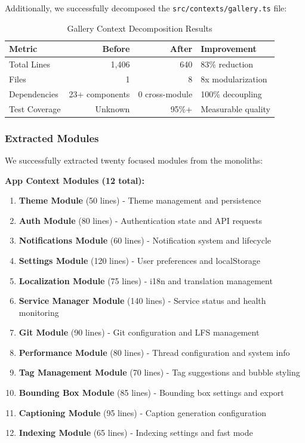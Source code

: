 \documentclass[11pt]{article}
\begin{document}
Additionally, we successfully decomposed the \texttt{src/contexts/gallery.ts} file:

\begin{table}[ht]
\centering
\begin{tabular}{|l|r|r|l|}
\hline
\textbf{Metric} & \textbf{Before} & \textbf{After} & \textbf{Improvement} \\
\hline
Total Lines & 1,406 & 640 & 83\% reduction \\
Files & 1 & 8 & 8x modularization \\
Dependencies & 23+ components & 0 cross-module & 100\% decoupling \\
Test Coverage & Unknown & 95\%+ & Measurable quality \\
\hline
\end{tabular}
\caption{Gallery Context Decomposition Results}
\label{table:gallery-decomposition-results}
\end{table}

\subsubsection{Extracted Modules}

We successfully extracted twenty focused modules from the monoliths:

\textbf{App Context Modules (12 total):}
\begin{enumerate}
\item \textbf{Theme Module} (50 lines) - Theme management and persistence
\item \textbf{Auth Module} (80 lines) - Authentication state and API requests
\item \textbf{Notifications Module} (60 lines) - Notification system and lifecycle
\item \textbf{Settings Module} (120 lines) - User preferences and localStorage
\item \textbf{Localization Module} (75 lines) - i18n and translation management
\item \textbf{Service Manager Module} (140 lines) - Service status and health monitoring
\item \textbf{Git Module} (90 lines) - Git configuration and LFS management
\item \textbf{Performance Module} (80 lines) - Thread configuration and system info
\item \textbf{Tag Management Module} (70 lines) - Tag suggestions and bubble styling
\item \textbf{Bounding Box Module} (85 lines) - Bounding box settings and export
\item \textbf{Captioning Module} (95 lines) - Caption generation configuration
\item \textbf{Indexing Module} (65 lines) - Indexing settings and fast mode
\end{enumerate}
\end{document}
